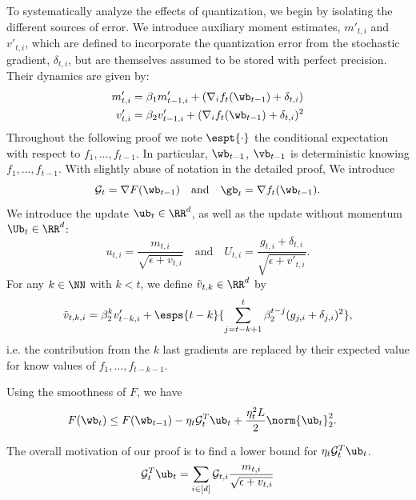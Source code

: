 \documentclass[11pt, letterpaper]{article}
\begin{document}
To systematically analyze the effects of quantization, we begin by isolating the different sources of error. We introduce auxiliary moment estimates, $m'_{t,i}$ and $v'_{t,i}$, which are defined to incorporate the quantization error from the stochastic gradient, $\delta_{t,i}$, but are themselves assumed to be stored with perfect precision. Their dynamics are given by:
\begin{equation}
\begin{aligned}
    m'_{t, i} &=\beta_1 m'_{t-1, i} + (\nabla_i f_t(\wb_{t-1})+\delta_{t,i})\\
    v'_{t, i} &=\beta_2 v'_{t-1, i} + (\nabla_i f_t(\wb_{t-1})+\delta_{t,i})^2\\
\end{aligned}
\end{equation}
Throughout the following proof we note $\espt{\cdot}$ the conditional expectation with respect to $f_1, \ldots, f_{t-1}$. In particular, $\wb_{t-1}$, $\vb_{t-1}$ is deterministic knowing $f_1, \ldots, f_{t-1}$.
With slightly abuse of notation in the detailed proof, We introduce 
\begin{equation}\mathcal{G}_t = \nabla F(\wb_{t-1}) \quad \text{and} \quad \gb_t = \nabla f_t(\wb_{t-1}).\end{equation}
We introduce the update $\ub_t \in \RR^d$, as well as the update without momentum $\Ub_t \in \RR^d$:
\begin{equation}
\label{app:eq:def_u}
    u_{t, i} = \frac{m_{t, i}}{\sqrt{\epsilon+v_{t, i}}} \quad \text{and}\quad
    U_{t, i} = \frac{g_{t, i}+\delta_{t,i}}{\sqrt{\epsilon+v'_{t, i}}}.
\end{equation}
For any $k \in \NN$ with $k < t$, we define $\tilde{v}_{t, k} \in\RR^d$ by
\begin{equation}
\tilde{v}_{t, k,  i} = \beta_2^{k} v'_{t - k, i} + \esps{t - k}{\sum_{j=t- k + 1}^{t}\beta_2^{t-j}(g_{j,i}+\delta_{j,i})^2},
\end{equation}
i.e. the contribution from the $k$ last gradients are replaced by their expected value for know values of $f_1, \ldots, f_{t - k - 1}$.

Using the smoothness of $F$, we have
\begin{align*}
    &F(\wb_t)  \leq F(\wb_{t-1}) - \eta_t \mathcal{G}_t^T \ub_t
    + \frac{\eta_t^2 L}{2}\norm{\ub_t}^2_2.
\end{align*}

The overall motivation of our proof is to find a lower bound for $\eta_t \mathcal{G}_t^T \ub_t$.
\begin{align}
    \mathcal{G}_t^T \ub_t=\sum_{i\in[d]}\mathcal{G}_{t, i}\frac{m_{t, i}}{\sqrt{\epsilon+v_{t, i}}}
\end{align}
\end{document}

